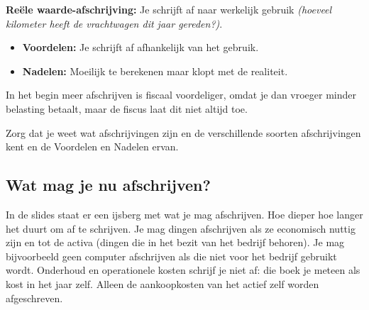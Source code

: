\documentclass[a4paper,11pt]{article}
\begin{document}
\vspace{0.5em}
\noindent\textbf{Reële waarde-afschrijving:} Je schrijft af naar werkelijk gebruik
\textit{(hoeveel kilometer heeft de vrachtwagen dit jaar gereden?)}.\\
\begin{minipage}[t]{0.58\textwidth}
    \vspace{0pt}
    \begin{itemize}
        \item \textbf{Voordelen:} Je schrijft af afhankelijk van het gebruik.
        \item \textbf{Nadelen:} Moeilijk te berekenen maar klopt met de realiteit.
    \end{itemize}
\end{minipage}%
\hfill
\begin{minipage}[t]{0.4\textwidth}
    \vspace{0pt}
    \centering
\end{minipage}

In het begin meer afschrijven is fiscaal voordeliger, omdat je dan vroeger minder belasting betaalt,
maar de fiscus laat dit niet altijd toe.

\begin{examenbox}
    Zorg dat je weet wat afschrijvingen zijn en de verschillende soorten afschrijvingen kent en de Voordelen
    en Nadelen ervan.
\end{examenbox}

\subsection{Wat mag je nu afschrijven?}
In de slides staat er een ijsberg
met wat je mag afschrijven. Hoe dieper
hoe langer het duurt om af te schrijven.
Je mag dingen afschrijven als ze economisch nuttig zijn en
tot de activa (dingen die in het bezit van het bedrijf behoren).
Je mag bijvoorbeeld geen computer afschrijven
als die niet voor het bedrijf gebruikt wordt.
Onderhoud en operationele kosten schrijf je niet af: die boek je meteen als kost
in het jaar zelf. Alleen de aankoopkosten van het actief zelf worden afgeschreven.
\end{document}
